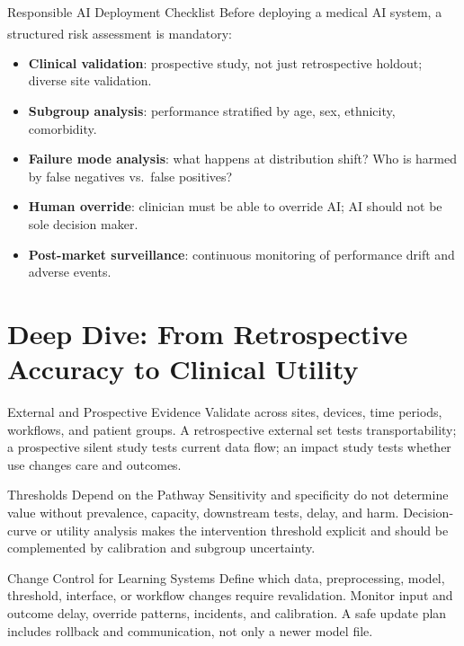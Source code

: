 \begin{v3topic}{Responsible AI Deployment Checklist}
    Before deploying a medical AI system, a structured risk assessment is mandatory\textsuperscript{\cite[][pp.~2025--2027]{mccradddenPatientSafetyQuality2020}}:
    \begin{itemize}
        \item \textbf{Clinical validation}: prospective study, not just retrospective holdout; diverse site validation.
        \item \textbf{Subgroup analysis}: performance stratified by age, sex, ethnicity, comorbidity.
        \item \textbf{Failure mode analysis}: what happens at distribution shift? Who is harmed by false negatives vs.\ false positives?
        \item \textbf{Human override}: clinician must be able to override AI; AI should not be sole decision maker.
        \item \textbf{Post-market surveillance}: continuous monitoring of performance drift and adverse events.
    \end{itemize}
\end{v3topic}

%
\section{Deep Dive: From Retrospective Accuracy to Clinical Utility}
\begin{v3topic}{External and Prospective Evidence}
Validate across sites, devices, time periods, workflows, and patient groups.
A retrospective external set tests transportability; a prospective silent
study tests current data flow; an impact study tests whether use changes care
and outcomes.

\end{v3topic}
\begin{v3topic}{Thresholds Depend on the Pathway}
Sensitivity and specificity do not determine value without prevalence,
capacity, downstream tests, delay, and harm.
Decision-curve or utility analysis makes the intervention threshold explicit
and should be complemented by calibration and subgroup uncertainty.

\end{v3topic}
\begin{v3topic}{Change Control for Learning Systems}
Define which data, preprocessing, model, threshold, interface, or workflow
changes require revalidation.
Monitor input and outcome delay, override patterns, incidents, and calibration.
A safe update plan includes rollback and communication, not only a newer model
file.
\end{v3topic}


